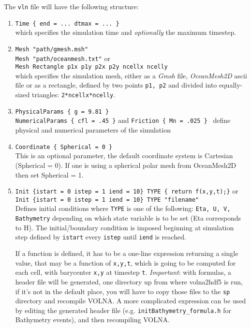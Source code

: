 \documentclass[11pt]{article}
\begin{document}
The \texttt{vln} file will have the following structure:
\begin{enumerate} 
\item \texttt{Time \{ end = ... dtmax = ... \}}\\
which specifies the simulation time and \textit{optionally} the maximum timestep.
\item \texttt{Mesh "path/gmesh.msh"} \\ \texttt{Mesh "path/oceanmesh.txt"} or\\
\texttt{Mesh Rectangle p1x p1y p2x p2y ncellx ncelly}\\
which specifies the simulation mesh, either as a \textit{Gmsh} file, \textit{OceanMesh2D} ascii file or as a rectangle, defined by two points \texttt{p1, p2} and divided into equally-sized triangles: \texttt{2*ncellx*ncelly}.
\item \texttt{PhysicalParams \{ g = 9.81 \}} \\
\texttt{NumericalParams \{ cfl = .45 \}} and  \texttt{Friction \{ Mn = .025 \}} \
define physical and numerical parameters of the simulation
\item \texttt{Coordinate \{ Spherical = 0 \}} \\
This is an optional parameter, the default coordinate system is Cartesian (Spherical = 0). If one is using a spherical polar mesh from OceanMesh2D then set Spherical = 1.
\item \texttt{Init \{istart = 0 istep = 1 iend = 10\} TYPE \{ return f(x,y,t);\}} or \\
\texttt{Init \{istart = 0 istep = 1 iend = 10\} TYPE "filename"}\\
Defines initial conditions where \texttt{TYPE} is one of the following: \texttt{Eta, U, V, Bathymetry} depending on which state variable is to be set (Eta corresponds to H). The initial/boundary condition is imposed beginning at simulation step defined by \texttt{istart} every \texttt{istep} until \texttt{iend} is reached.

If a function is defined, it has to be a one-line expression returning a single value, that may be a function of \texttt{x,y,t}, which is going to be computed for each cell, with barycenter \texttt{x,y} at timestep \texttt{t}. \emph{Important}: with formulas, a header file will be generated, one directory up from where volna2hdf5 is run, if it's not in the default place, you will have to copy those files to the \texttt{sp} directory and recompile VOLNA. A more complicated expression can be used by editing the generated header file (e.g. \texttt{initBathymetry\_formula.h} for Bathymetry events), and then recompiling VOLNA.


\end{enumerate}
\end{document}

